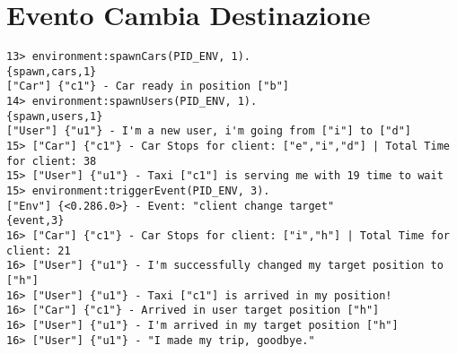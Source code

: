 \section{Evento Cambia Destinazione}\label{log_change_dest}
\begin{lstlisting}
13> environment:spawnCars(PID_ENV, 1).
{spawn,cars,1}
["Car"] {"c1"} - Car ready in position ["b"]
14> environment:spawnUsers(PID_ENV, 1).
{spawn,users,1}
["User"] {"u1"} - I'm a new user, i'm going from ["i"] to ["d"]
15> ["Car"] {"c1"} - Car Stops for client: ["e","i","d"] | Total Time for client: 38
15> ["User"] {"u1"} - Taxi ["c1"] is serving me with 19 time to wait
15> environment:triggerEvent(PID_ENV, 3).
["Env"] {<0.286.0>} - Event: "client change target"
{event,3}
16> ["Car"] {"c1"} - Car Stops for client: ["i","h"] | Total Time for client: 21
16> ["User"] {"u1"} - I'm successfully changed my target position to ["h"]
16> ["User"] {"u1"} - Taxi ["c1"] is arrived in my position!
16> ["Car"] {"c1"} - Arrived in user target position ["h"]
16> ["User"] {"u1"} - I'm arrived in my target position ["h"]
16> ["User"] {"u1"} - "I made my trip, goodbye."
\end{lstlisting}

